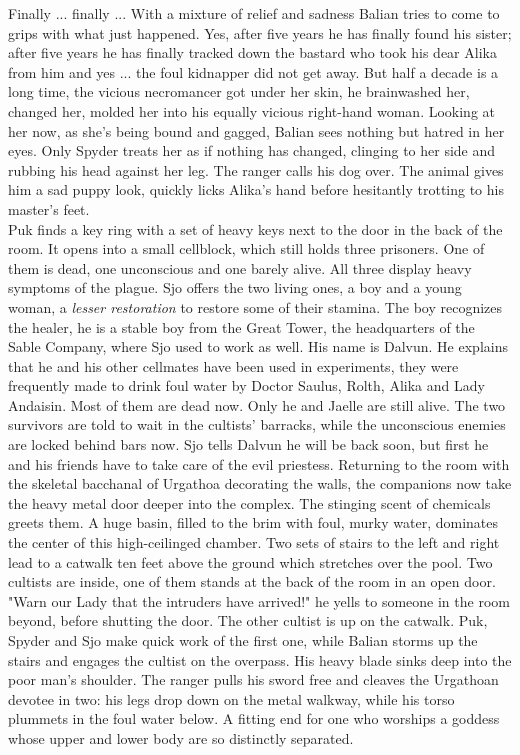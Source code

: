 Finally ... finally ... With a mixture of relief and sadness Balian tries to come to grips with what just happened. Yes, after five years he has finally found his sister; after five years he has finally tracked down the bastard who took his dear Alika from him and yes ... the foul kidnapper did not get away. But half a decade is a long time, the vicious necromancer got under her skin, he brainwashed her, changed her, molded her into his equally vicious right-hand woman. Looking at her now, as she's being bound and gagged, Balian sees nothing but hatred in her eyes. Only Spyder treats her as if nothing has changed, clinging to her side and rubbing his head against her leg. The ranger calls his dog over. The animal gives him a sad puppy look, quickly licks Alika's hand before hesitantly trotting to his master's feet.\\

Puk finds a key ring with a set of heavy keys next to the door in the back of the room. It opens into a small cellblock, which still holds three prisoners. One of them is dead, one unconscious and one barely alive. All three display heavy symptoms of the plague. Sjo offers the two living ones, a boy and a young woman, a {\itshape lesser restoration} to restore some of their stamina. The boy recognizes the healer, he is a stable boy from the Great Tower, the headquarters of the Sable Company, where Sjo used to work as well. His name is Dalvun. He explains that he and his other cellmates have been used in experiments, they were frequently made to drink foul water by Doctor Saulus, Rolth, Alika and Lady Andaisin. Most of them are dead now. Only he and Jaelle are still alive. The two survivors are told to wait in the cultists' barracks, while the unconscious enemies are locked behind bars now. Sjo tells Dalvun he will be back soon, but first he and his friends have to take care of the evil priestess. Returning to the room with the skeletal bacchanal of Urgathoa decorating the walls, the companions now take the heavy metal door deeper into the complex. The stinging scent of chemicals greets them. A huge basin, filled to the brim with foul, murky water, dominates the center of this high-ceilinged chamber. Two sets of stairs to the left and right lead to a catwalk ten feet above the ground which stretches over the pool. Two cultists are inside, one of them stands at the back of the room in an open door. "Warn our Lady that the intruders have arrived!" he yells to someone in the room beyond, before shutting the door. The other cultist is up on the catwalk. Puk, Spyder and Sjo make quick work of the first one, while Balian storms up the stairs and engages the cultist on the overpass. His heavy blade sinks deep into the poor man's shoulder. The ranger pulls his sword free and cleaves the Urgathoan devotee in two: his legs drop down on the metal walkway, while his torso plummets in the foul water below. A fitting end for one who worships a goddess whose upper and lower body are so distinctly separated.\\

